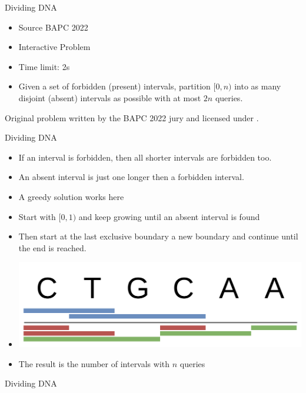 \documentclass[11pt,pdf, aspectratio=169]{beamer}
\begin{document}
  \begin{frame}{Dividing DNA}
    \begin{itemize}
      \item Source BAPC 2022
      \item Interactive Problem
      \item Time limit: 2s
      \item  Given a set of forbidden (present) intervals, partition $[0,n)$ into as many disjoint (absent) intervals as possible with at most $2n$ queries.

    \end{itemize}
    Original problem written by the BAPC 2022 jury and licensed under \doclicenseLongNameRef.

    \doclicenseImage
  \end{frame}
  \begin{frame}{Dividing DNA}
    \begin{itemize}
      \item<+-> If an interval is forbidden, then all shorter intervals are forbidden too.
      \item<+-> An absent interval is just one longer then a forbidden interval.
      \item<+-> A greedy solution works here
      \item<+-> Start with $[0,1)$ and keep growing until an absent interval is found
      \item<+-> Then start at the last exclusive boundary a new boundary and continue until the end is reached.
      \item<+-> \includegraphics[width=.8\linewidth]{images/session-4/bapc-d}
      \item<+-> The result is the number of intervals with $n$ queries
    \end{itemize}

  \end{frame}
  \begin{frame}[containsverbatim]{Dividing DNA}
    \inputminted{python}{code/session-4/bapc-d.py}
  \end{frame}
\end{document}
